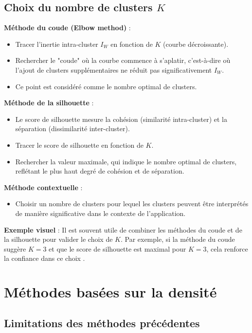\documentclass[10pt,a4paper]{article}
\begin{document}
\subsection*{Choix du nombre de clusters $K$}

\textbf{Méthode du coude (Elbow method)} :
\begin{itemize}
    \item Tracer l'inertie intra-cluster $I_W$ en fonction de $K$ (courbe décroissante).
    \item Rechercher le "coude" où la courbe commence à s'aplatir, c'est-à-dire où l'ajout de clusters supplémentaires ne réduit pas significativement $I_W$.
    \item Ce point est considéré comme le nombre optimal de clusters.
\end{itemize}

\textbf{Méthode de la silhouette} :
\begin{itemize}
    \item Le score de silhouette mesure la cohésion (similarité intra-cluster) et la séparation (dissimilarité inter-cluster).
    \item Tracer le score de silhouette en fonction de $K$.
    \item Rechercher la valeur maximale, qui indique le nombre optimal de clusters, reflétant le plus haut degré de cohésion et de séparation.
\end{itemize}

\textbf{Méthode contextuelle} :
\begin{itemize}
    \item Choisir un nombre de clusters pour lequel les clusters peuvent être interprétés de manière significative dans le contexte de l'application.
\end{itemize}

\textbf{Exemple visuel} :
Il est souvent utile de combiner les méthodes du coude et de la silhouette pour valider le choix de $K$. Par exemple, si la méthode du coude suggère $K=3$ et que le score de silhouette est maximal pour $K=3$, cela renforce la confiance dans ce choix \cite{elbow-silhouette-datacamp, elbow-silhouette-kdnuggets}.

\section*{Méthodes basées sur la densité}

\subsection*{Limitations des méthodes précédentes}
\end{document}
